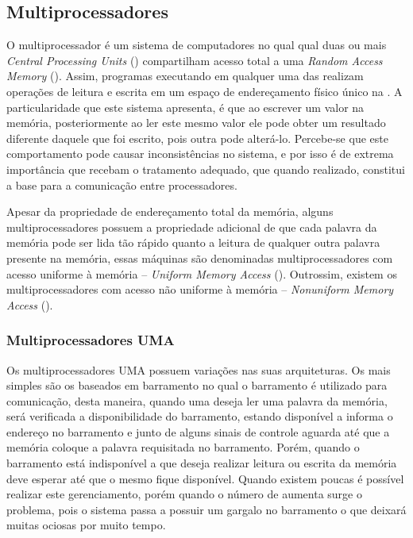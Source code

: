 \subsection{Multiprocessadores}
\label{subsec:multiprocessadores}

O multiprocessador é um sistema de computadores no qual qual duas ou mais \textit{Central Processing Units} (\cpus) compartilham acesso total a uma \textit{Random Access Memory} (\ram). Assim, programas executando em qualquer uma das \cpus realizam operações de leitura e escrita em um espaço de endereçamento físico único na \ram. A particularidade que este sistema apresenta, é que ao escrever um valor na memória, posteriormente ao ler este mesmo valor ele pode obter um resultado diferente daquele que foi escrito, pois outra \cpu pode alterá-lo. Percebe-se que este comportamento pode causar inconsistências no sistema, e por isso é de extrema importância que recebam o tratamento adequado, que quando realizado, constitui a base para a comunicação entre processadores.

Apesar da propriedade de endereçamento total da memória, alguns multiprocessadores possuem a propriedade adicional de que cada palavra da memória pode ser lida tão rápido quanto a leitura de qualquer outra palavra presente na memória, essas máquinas são denominadas multiprocessadores com acesso uniforme à memória -- \textit{Uniform Memory Access} (\uma). Outrossim, existem os multiprocessadores com acesso não uniforme à memória -- \textit{Nonuniform Memory Access} (\numa).

\subsubsection{Multiprocessadores UMA}
\label{subsubsec:hw-multiprocessadores-uma}

Os multiprocessadores UMA possuem variações nas suas arquiteturas. Os mais simples são os baseados em barramento no qual o barramento é utilizado para comunicação, desta maneira, quando uma \cpu deseja ler uma palavra da memória, será verificada a disponibilidade do barramento, estando disponível a \cpu informa o endereço no barramento e junto de alguns sinais de controle aguarda até que a memória coloque a palavra requisitada no barramento. Porém, quando o barramento está indisponível a \cpu que deseja realizar leitura ou escrita da memória deve esperar até que o mesmo fique disponível. Quando existem poucas \cpus é possível realizar este gerenciamento, porém quando o número de \cpus aumenta surge o problema, pois o sistema passa a possuir um gargalo no barramento o que deixará muitas \cpus ociosas por muito tempo.

